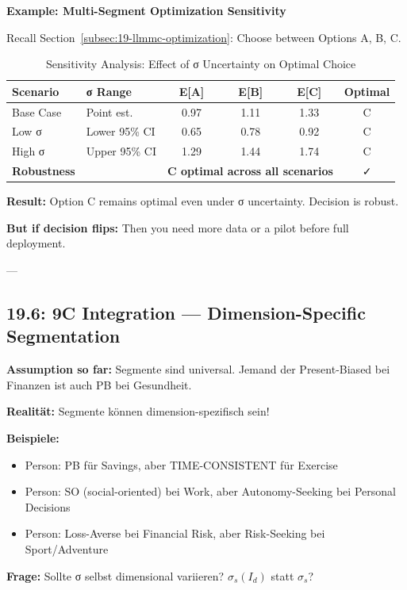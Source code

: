 \textbf{Example: Multi-Segment Optimization Sensitivity}

Recall Section~\ref{subsec:19-llmmc-optimization}: Choose between Options A, B, C.

\begin{table}[htbp]
\centering
\caption{Sensitivity Analysis: Effect of σ Uncertainty on Optimal Choice}
\label{tab:19-sensitivity-example}
\renewcommand{\arraystretch}{1.3}
\small
\begin{tabular}{@{}llcccc@{}}
\toprule
\textbf{Scenario} & \textbf{σ Range} & \textbf{E[A]} & \textbf{E[B]} & \textbf{E[C]} & \textbf{Optimal} \\
\midrule
Base Case & Point est. & 0.97 & 1.11 & 1.33 & C \\
Low σ & Lower 95\% CI & 0.65 & 0.78 & 0.92 & C \\
High σ & Upper 95\% CI & 1.29 & 1.44 & 1.74 & C \\
\midrule
\textbf{Robustness} & & \multicolumn{3}{c}{\textbf{C optimal across all scenarios}} & ✓ \\
\bottomrule
\end{tabular}
\end{table}

\textbf{Result:} Option C remains optimal even under σ uncertainty. Decision is robust.

\textbf{But if decision flips:} Then you need more data or a pilot before full deployment.

---

\subsection{19.6: 9C Integration — Dimension-Specific Segmentation}
\label{subsec:19-9c-integration}

\begin{tcolorbox}[colback=orange!5!white, colframe=orange!75!black, title=\textbf{Problem: Universal vs. Dimensional Segmentation}]

\textbf{Assumption so far:} Segmente sind universal. Jemand der Present-Biased bei Finanzen ist auch PB bei Gesundheit.

\textbf{Realität:} Segmente können dimension-spezifisch sein!

\textbf{Beispiele:}
\begin{itemize}[nosep]
\item Person: PB für Savings, aber TIME-CONSISTENT für Exercise
\item Person: SO (social-oriented) bei Work, aber Autonomy-Seeking bei Personal Decisions
\item Person: Loss-Averse bei Financial Risk, aber Risk-Seeking bei Sport/Adventure
\end{itemize}

\textbf{Frage:} Sollte σ selbst dimensional variieren? $\sigma_s(I_d)$ statt $\sigma_s$?

\end{tcolorbox}

